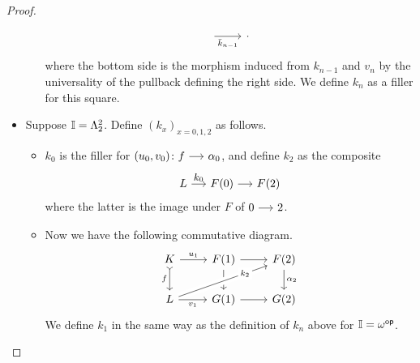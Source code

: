\documentclass[a4paper,  dvipsnames, 11pt]{amsart}
\begin{document}
\begin{proof}
\begin{itemize}
\begin{itemize}
\[\begin{tikzcd}
							\ar[r,"\bar{k}_{n-1}"']
								&
								\cdot
						\end{tikzcd}
					\]
					where the bottom side is the morphism induced from $k_{n-1}$ and $v_n$ by the universality of the pullback defining the right side.
					We define $k_n$ as a filler for this square.
			\end{itemize}
		\item %
			Suppose $\mathbb{I}=\Lambda^2_2$. Define $(k_x)_{x=0,1,2}$ as follows.
			\begin{itemize}
				\item %
					$k_0$ is the filler for $(u_0,v_0)\colon f \arr \alpha_0$,
					and define $k_2$ as the composite
					\[
						L\arr"k_0"
						F(0)\arr F(2)
					\]
					where the latter is the image under $F$ of $0\arr 2$.
				\item %
					Now we have the following commutative diagram.
					\[
						\begin{tikzcd}
							K
							\ar[r,"u_1"]
							\ar[d,tail,"f"']
								&
								F(1)
								\ar[r]
								\ar[d]
									&
									F(2)
									\ar[d,"\alpha_{2}"]
							\\
							L
							\ar[rru,crossing over,"k_{2}"{description,near end}]
							\ar[r,"v_1"']
								&
								G(1)
								\ar[r]
									&
									G(2)
						\end{tikzcd}
					\]
					We define $k_1$ in the same way as the definition of $k_n$ above for $\mathbb{I}=\omega^{\mathsf{op}}$.
				\qedhere
			\end{itemize}
	\end{itemize}
\end{proof}
\end{document}
